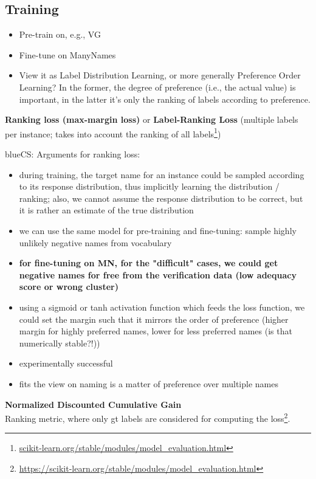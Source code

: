 \documentclass[11pt,a4paper]{article}
\newcommand{\cs}[1]{\begin{color}{blue}CS: #1\end{color}\xspace}
\begin{document}
\subsection{Training}
\label{ssec:model_training}
\begin{itemize}
	\item Pre-train on, e.g., VG
	\item Fine-tune on ManyNames 
	\item View it as Label Distribution Learning, or more generally Preference Order Learning? In the former, the degree of preference (i.e., the actual value) is important, in the latter it's only the ranking of labels according to preference. 
\end{itemize}
\textbf{Ranking loss (max-margin loss)} or \textbf{Label-Ranking Loss} (multiple labels per instance; takes into account the ranking of all labels\footnote{\url{scikit-learn.org/stable/modules/model_evaluation.html}})\\
\cs{Arguments for ranking loss: 
\begin{itemize}
	\item during training, the target name for an instance could be sampled according to its response distribution, thus implicitly learning the distribution / ranking; also, we cannot assume the response distribution to be correct, but it is rather an estimate of the true distribution
	\item we can use the same model for pre-training and fine-tuning: sample highly unlikely negative names from vocabulary
	\item \textbf{for fine-tuning on MN, for the "difficult" cases, we could get negative names for free from the verification data (low adequacy score or wrong cluster)}
	\item using a sigmoid or tanh activation function which feeds the loss function, we could set the margin such that it mirrors the order of preference (higher margin for highly preferred names, lower for less preferred names (is that numerically stable?!))
	\item experimentally successful
	\item fits the view on naming is a matter of preference over multiple names
\end{itemize}
}

\textbf{Normalized Discounted Cumulative Gain}\\
Ranking metric, where only gt labels are considered for computing the loss\footnote{\url{https://scikit-learn.org/stable/modules/model_evaluation.html}}.\\
\end{document}
